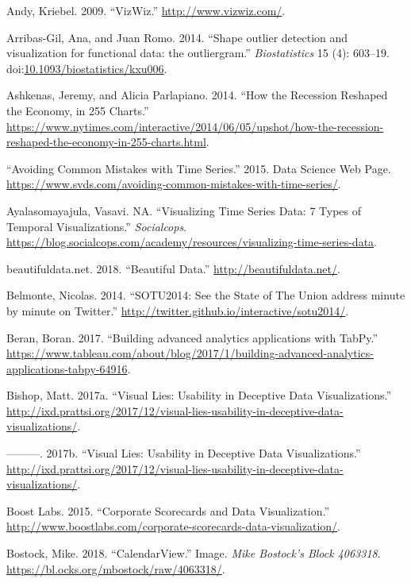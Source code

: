 \documentclass[]{book}
\theoremstyle{definition}
\theoremstyle{definition}
\theoremstyle{definition}
\theoremstyle{remark}
\begin{document}
\hypertarget{ref-vizwiz}{}
Andy, Kriebel. 2009. ``VizWiz.'' \url{http://www.vizwiz.com/}.

\hypertarget{ref-outliar}{}
Arribas-Gil, Ana, and Juan Romo. 2014. ``Shape outlier detection and
visualization for functional data: the outliergram.''
\emph{Biostatistics} 15 (4): 603--19.
doi:\href{https://doi.org/10.1093/biostatistics/kxu006}{10.1093/biostatistics/kxu006}.

\hypertarget{ref-recession_economy}{}
Ashkenas, Jeremy, and Alicia Parlapiano. 2014. ``How the Recession
Reshaped the Economy, in 255 Charts.''
\url{https://www.nytimes.com/interactive/2014/06/05/upshot/how-the-recession-reshaped-the-economy-in-255-charts.html}.

\hypertarget{ref-TimeSeries}{}
``Avoiding Common Mistakes with Time Series.'' 2015. Data Science Web
Page.
\url{https://www.svds.com/avoiding-common-mistakes-with-time-series/}.

\hypertarget{ref-aya-time-series}{}
Ayalasomayajula, Vasavi. NA. ``Visualizing Time Series Data: 7 Types of
Temporal Visualizations.'' \emph{Socialcops}.
\url{https://blog.socialcops.com/academy/resources/visualizing-time-series-data}.

\hypertarget{ref-data_beaut}{}
beautifuldata.net. 2018. ``Beautiful Data.''
\url{http://beautifuldata.net/}.

\hypertarget{ref-SotU2014}{}
Belmonte, Nicolas. 2014. ``SOTU2014: See the State of The Union address
minute by minute on Twitter.''
\url{http://twitter.github.io/interactive/sotu2014/}.

\hypertarget{ref-TabPy}{}
Beran, Boran. 2017. ``Building advanced analytics applications with
TabPy.''
\url{https://www.tableau.com/about/blog/2017/1/building-advanced-analytics-applications-tabpy-64916}.

\hypertarget{ref-visual-lies}{}
Bishop, Matt. 2017a. ``Visual Lies: Usability in Deceptive Data
Visualizations.''
\url{http://ixd.prattsi.org/2017/12/visual-lies-usability-in-deceptive-data-visualizations/}.

\hypertarget{ref-study_asks}{}
---------. 2017b. ``Visual Lies: Usability in Deceptive Data
Visualizations.''
\url{http://ixd.prattsi.org/2017/12/visual-lies-usability-in-deceptive-data-visualizations/}.

\hypertarget{ref-SCORECARDS}{}
Boost Labs. 2015. ``Corporate Scorecards and Data Visualization.''
\url{http://www.boostlabs.com/corporate-scorecards-data-visualization/}.

\hypertarget{ref-CalendarView}{}
Bostock, Mike. 2018. ``CalendarView.'' Image. \emph{Mike Bostock's Block
4063318}. \url{https://bl.ocks.org/mbostock/raw/4063318/}.
\end{document}
